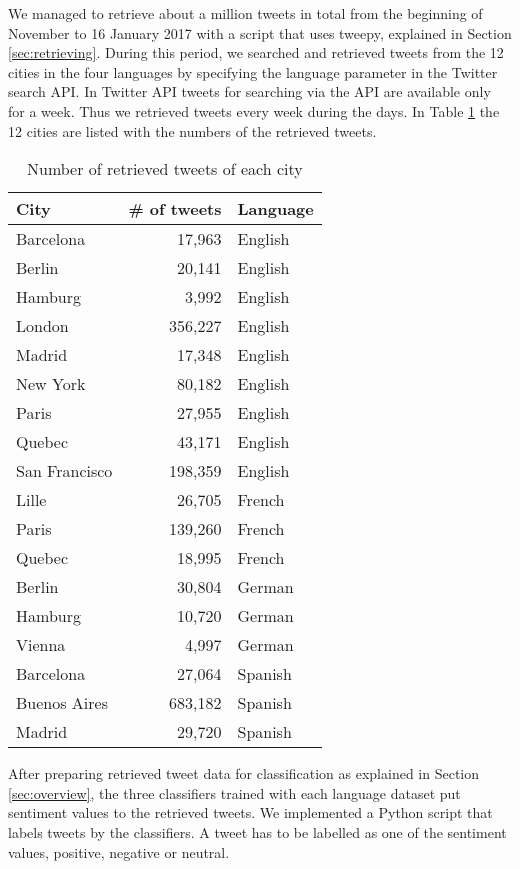 We managed to retrieve about a million tweets in total from the beginning of November to 16 January 2017 with a script that uses tweepy, explained in Section \ref{sec:retrieving}.
During this period, we searched and retrieved tweets from the 12 cities in the four languages by specifying the language parameter in the Twitter search API.
In Twitter API tweets for searching via the API are available only for a week.
Thus we retrieved tweets every week during the days.
In Table \ref{tab:cities} the 12 cities are listed with the numbers of the retrieved tweets.

\begin{table}[ht]
	\caption{Number of retrieved tweets of each city}
	\centering
	\begin{tabular}{|l|r|l|} \hline
	City&\# of tweets&Language\\ \hline \hline
	Barcelona & 17,963 & English \\ \hline
	Berlin & 20,141 & English\\ \hline
	Hamburg & 3,992 & English\\ \hline
	London  & 356,227& English\\ \hline
	Madrid & 17,348 & English \\ \hline
	New York  & 80,182  & English\\ \hline
	Paris & 27,955 & English \\ \hline
	Quebec & 43,171 & English \\ \hline
	San Francisco & 198,359  & English\\ \hline
	Lille & 26,705  & French\\ \hline
	Paris & 139,260 & French\\ \hline
	Quebec & 18,995 & French\\ \hline
	Berlin & 30,804 & German\\ \hline
	Hamburg & 10,720 & German\\ \hline
	Vienna & 4,997  & German\\ \hline
	Barcelona&27,064 & Spanish\\ \hline
	Buenos Aires&683,182  & Spanish\\ \hline
	Madrid& 29,720 & Spanish\\ \hline
	\end{tabular}
	\label{tab:cities}
\end{table}

After preparing retrieved tweet data for classification as explained in Section \ref{sec:overview}, the three classifiers trained with each language dataset put sentiment values to the retrieved tweets.
We implemented a Python script that labels tweets by the classifiers.
A tweet has to be labelled as one of the sentiment values, positive, negative or neutral.


